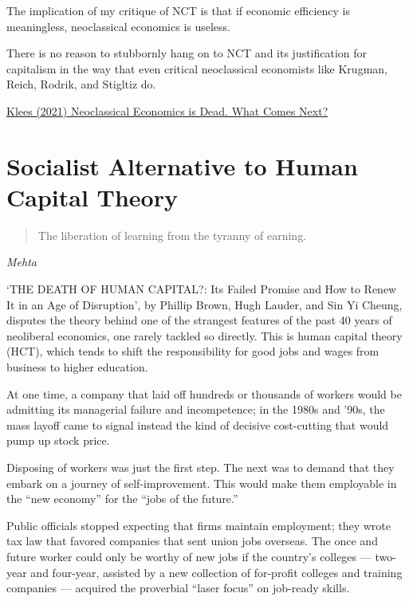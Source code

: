 \documentclass[
]{book}
\begin{document}
The implication of my critique of NCT is that if economic efficiency is meaningless, neoclassical economics is useless.

There is no reason to stubbornly hang on to NCT and its justification for capitalism in the way that even critical neoclassical economists like Krugman, Reich, Rodrik, and Stigltiz do.

\href{https://evonomics.com/klees-neoclassical-economics-failed-what-comes-next/}{Klees (2021) Neoclassical Economics is Dead. What Comes Next?}

\hypertarget{socialist-alternative-to-human-capital-theory}{%
\section{Socialist Alternative to Human Capital Theory}\label{socialist-alternative-to-human-capital-theory}}

\begin{quote}
The liberation of learning from the tyranny of earning.
\end{quote}

\emph{Mehta}

`THE DEATH OF HUMAN CAPITAL?: Its Failed Promise and How to Renew It in an Age of Disruption', by Phillip Brown, Hugh Lauder, and Sin Yi Cheung, disputes the theory behind one of the strangest features of the past 40 years of neoliberal economics, one rarely tackled so directly. This is human capital theory (HCT), which tends to shift the responsibility for good jobs and wages from business to higher education.

At one time, a company that laid off hundreds or thousands of workers would be admitting its managerial failure and incompetence; in the 1980s and '90s, the mass layoff came to signal instead the kind of decisive cost-cutting that would pump up stock price.

Disposing of workers was just the first step. The next was to demand that they embark on a journey of self-improvement. This would make them employable in the ``new economy'' for the ``jobs of the future.''

Public officials stopped expecting that firms maintain employment; they wrote tax law that favored companies that sent union jobs overseas. The once and future worker could only be worthy of new jobs if the country's colleges --- two-year and four-year, assisted by a new collection of for-profit colleges and training companies --- acquired the proverbial ``laser focus'' on job-ready skills.
\end{document}
